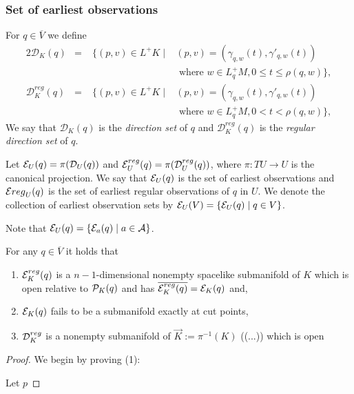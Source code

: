 \subsubsection{Set of earliest observations}
\begin{definition}
For $q\in \overline{V}$ we define
\begin{alignat*}{2}
    \mathcal{D}_K(q) &=\; &\{(p,v)\in L^+K \mid &(p,v) = (\gamma_{q,w}(t),\gamma'_{q,w}(t)) \\
    &&&\text{ where } w\in L_q^+M, 0\leq t \leq \rho(q,w)\},\\
    \mathcal{D}^{reg}_K(q) &=\; &\{(p,v)\in L^+K \mid &(p,v) = (\gamma_{q,w}(t),\gamma'_{q,w}(t)) \\
    &&&\text{ where } w\in L_q^+M, 0 < t < \rho(q,w)\},
\end{alignat*}
We say that $\mathcal{D}_K(q)$ is the \emph{direction set} of $q$ and $\mathcal{D}^{reg}_K(q)$ is the \emph{regular direction set} of $q$.

Let $\mathcal{E}_U(q) = \pi(\mathcal{D}_U(q))$ and $\mathcal{E}^{reg}_U(q) = \pi(\mathcal{D}^{reg}_U(q))$, where $\pi:TU\to U$ is the canonical projection. We say that $\mathcal{E}_U(q)$ is the set of earliest observations and $\mathcal{E}{reg}_U(q)$ is the set of earliest regular observations of $q$ in $U$. We denote the collection of earliest observation sets by $\mathcal{E}_U(V) = \{ \mathcal{E}_U(q) \mid q\in V\}$.
\end{definition}

Note that $\mathcal{E}_U(q) = \{ \mathcal{E}_a(q) \mid a\in \mathcal{A} \}$.

\begin{proposition}\label{prop:submanifolds}
For any $q\in \overline{V}$ it holds that
\begin{enumerate}[label={\textnormal{(\arabic*)}}]
    \item $\mathcal{E}^{reg}_K(q)$ is a $n-1$-dimensional nonempty spacelike submanifold of $K$ which is open relative to $\mathcal{P}_K(q)$ and has $\overline{\mathcal{E}^{reg}_K(q)} = \mathcal{E}_K(q)$ and,
    \item $\mathcal{E}_K(q)$ fails to be a submanifold exactly at cut points,
    \item $\mathcal{D}^{reg}_K$ is a nonempty submanifold of $\overrightarrow{K}:=\pi^{-1}(K)$ ((...)) which is open 
\end{enumerate}
\end{proposition}
\begin{proof}
We begin by proving (1):

Let $p$

\end{proof}

